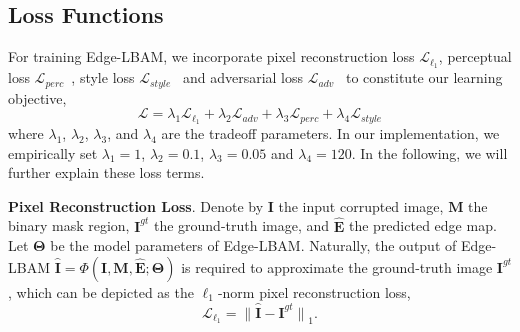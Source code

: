 \documentclass[10pt,journal,compsoc]{IEEEtran}
\begin{document}
\subsection{Loss Functions}\label{sec7}
%
For training Edge-LBAM, we incorporate pixel reconstruction loss $\mathcal{L}_{\ell_{1}}$, perceptual loss $\mathcal{L}_{perc}$~\cite{Johnson2016Perceptual}, style loss $\mathcal{L}_{style}$~\cite{Gatys2016ImageST} and adversarial loss $\mathcal{L}_{adv}$~\cite{Goodfellow_GAN} to constitute our learning objective,
%
\begin{equation}\label{joint-loss}
\mathcal{L} = \lambda_{1} \mathcal{L}_{\ell_{1}} + \lambda_{2} \mathcal{L}_{adv} + \lambda_{3} \mathcal{L}_{perc} + \lambda_{4} \mathcal{L}_{style}
\end{equation}
%
where $\lambda_{1}$, $\lambda_{2}$, $\lambda_{3}$, and $\lambda_{4}$ are the tradeoff parameters.
%
In our implementation, we empirically set $\lambda_{1} = 1$, $\lambda_{2} = 0.1$, $\lambda_{3} = 0.05$ and $\lambda_{4} = 120$.
%
In the following, we will further explain these loss terms.
%
%


{\textbf{Pixel Reconstruction Loss}.} Denote by $\mathbf{I}$ the input corrupted image, $\mathbf{M}$ the binary mask region, $\mathbf{I}^{gt}$ the ground-truth image, and $\hat{\mathbf{E}}$ the predicted edge map.
%
Let $\boldsymbol{\Theta}$ be the model parameters of Edge-LBAM.
%
Naturally, the output of Edge-LBAM $\hat{\mathbf{I}} = \Phi(\mathbf{I}, \mathbf{M}, \hat{\mathbf{E}}; {\boldsymbol\Theta})$ is required to approximate the ground-truth image $\mathbf{I}^{gt}$, which can be depicted as the $\ell_{1}$-norm pixel reconstruction loss,
\begin{equation}
\label{l1loss}
\mathcal{L}_{\ell_{1}} = {\parallel \hat{\mathbf{I}} - \mathbf{I}^{gt} \parallel}_{1}.
\end{equation}


%

\end{document}
